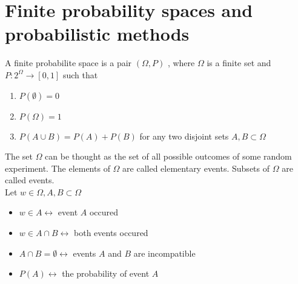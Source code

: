 \documentclass[../main.tex]{subfiles}
\begin{document}
\section{Finite probability spaces and probabilistic methods}

\begin{defn}
	A finite probabilite space is a pair $( \Omega, P) $ , where $\Omega$ is a finite set and $P : 2^{\Omega}\to [ 0,1] $ such that
	\begin{enumerate}
		\item $P( \emptyset) =0$ 
		\item $P( \Omega) =1$ 
		\item $P( A\cup B) = P( A) + P( B) $ for any two disjoint sets $A,B \subset \Omega$ 
	\end{enumerate}
\end{defn}
The set $\Omega$ can be thought as the set of all possible outcomes of some random experiment.
The elements of $\Omega$ are called elementary events. Subsets of $\Omega$ are called events.\\
Let $w\in \Omega	, A,B \subset \Omega$ 
\begin{itemize}
\item $w \in A \leftrightarrow$ event $A$ occured
\item $w \in A\cap B \leftrightarrow$ both events occured
\item $A\cap B = \emptyset \leftrightarrow$ events $A$  and $B$ are incompatible
\item $P( A) \leftrightarrow$ the probability of event $A$ 
\end{itemize}
\end{document}
